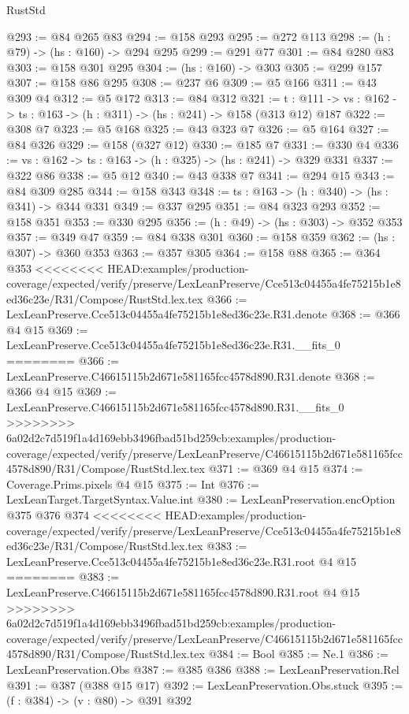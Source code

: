\begin{lexlean}{RustStd}
\begin{coremodule}
{\begin{coremodule}
@293 := @84 @265 @83
@294 := @158 @293
@295 := @272 @113
@298 := (h : @79) -> (hs : @160) -> @294 @295
@299 := @291 @77
@301 := @84 @280 @83
@303 := @158 @301 @295
@304 := (hs : @160) -> @303
@305 := @299 @157
@307 := @158 @86 @295
@308 := @237 @6
@309 := @5 @166
@311 := @43 @309 @4
@312 := @5 @172
@313 := @84 @312
@321 := {t : @111} ->
  {vs : @162} -> {ts : @163} -> (h : @311) -> (hs : @241) -> @158 (@313 @12) @187
@322 := @308 @7
@323 := @5 @168
@325 := @43 @323 @7
@326 := @5 @164
@327 := @84 @326
@329 := @158 (@327 @12)
@330 := @185 @7
@331 := @330 @4
@336 := {vs : @162} -> {ts : @163} -> (h : @325) -> (hs : @241) -> @329 @331
@337 := @322 @86
@338 := @5 @12
@340 := @43 @338 @7
@341 := @294 @15
@343 := @84 @309 @285
@344 := @158 @343
@348 := {ts : @163} -> (h : @340) -> (hs : @341) -> @344 @331
@349 := @337 @295
@351 := @84 @323 @293
@352 := @158 @351
@353 := @330 @295
@356 := (h : @49) -> (hs : @303) -> @352 @353
@357 := @349 @47
@359 := @84 @338 @301
@360 := @158 @359
@362 := (hs : @307) -> @360 @353
@363 := @357 @305
@364 := @158 @88
@365 := @364 @353
<<<<<<<< HEAD:examples/production-coverage/expected/verify/preserve/LexLeanPreserve/Cce513c04455a4fe75215b1e8ed36c23e/R31/Compose/RustStd.lex.tex
@366 := LexLeanPreserve.Cce513c04455a4fe75215b1e8ed36c23e.R31.denote
@368 := @366 @4 @15
@369 := LexLeanPreserve.Cce513c04455a4fe75215b1e8ed36c23e.R31.__fits_0
========
@366 := LexLeanPreserve.C46615115b2d671e581165fcc4578d890.R31.denote
@368 := @366 @4 @15
@369 := LexLeanPreserve.C46615115b2d671e581165fcc4578d890.R31.__fits_0
>>>>>>>> 6a02d2c7d519f1a4d169ebb3496fbad51bd259cb:examples/production-coverage/expected/verify/preserve/LexLeanPreserve/C46615115b2d671e581165fcc4578d890/R31/Compose/RustStd.lex.tex
@371 := @369 @4 @15
@374 := Coverage.Prims.pixels @4 @15
@375 := Int
@376 := LexLeanTarget.TargetSyntax.Value.int
@380 := LexLeanPreservation.encOption @375 @376 @374
<<<<<<<< HEAD:examples/production-coverage/expected/verify/preserve/LexLeanPreserve/Cce513c04455a4fe75215b1e8ed36c23e/R31/Compose/RustStd.lex.tex
@383 := LexLeanPreserve.Cce513c04455a4fe75215b1e8ed36c23e.R31.root @4 @15
========
@383 := LexLeanPreserve.C46615115b2d671e581165fcc4578d890.R31.root @4 @15
>>>>>>>> 6a02d2c7d519f1a4d169ebb3496fbad51bd259cb:examples/production-coverage/expected/verify/preserve/LexLeanPreserve/C46615115b2d671e581165fcc4578d890/R31/Compose/RustStd.lex.tex
@384 := Bool
@385 := Ne.{1}
@386 := LexLeanPreservation.Obs
@387 := @385 @386
@388 := LexLeanPreservation.Rel
@391 := @387 (@388 @15 @17)
@392 := LexLeanPreservation.Obs.stuck
@395 := (f : @384) -> (v : @80) -> @391 @392

\end{coremodule}}
\end{coremodule}
\end{lexlean}
